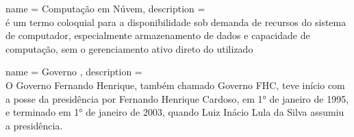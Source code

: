 \newpage

\newenvironment{glossario}{%
}{%
}

\begin{glossario}

    {
        name = {Computação em Núvem},
        description = {\\ é um termo coloquial para a disponibilidade sob demanda de recursos do sistema de computador, especialmente armazenamento de dados e capacidade de computação, sem o gerenciamento ativo direto do utilizado}
    }
    
    {
        name = {Governo },
        description = {\\ O Governo Fernando Henrique, também chamado Governo FHC, teve início com a posse da presidência por Fernando Henrique Cardoso, em 1° de janeiro de 1995, e terminado em 1° de janeiro de 2003, quando Luiz Inácio Lula da Silva assumiu a presidência.}
    }

\end{glossario}
